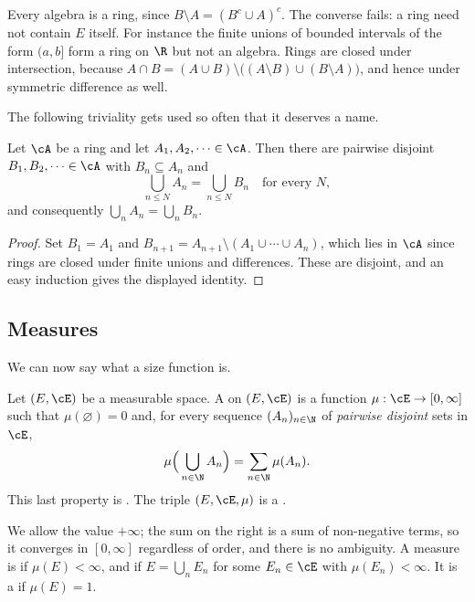 \begin{remark}
	Every algebra is a ring, since $B \setminus A = (B^c \cup A)^c$. The converse fails: a ring need not contain $E$ itself. For instance the finite unions of bounded intervals of the form $(a,b]$ form a ring on $\R$ but not an algebra. Rings are closed under intersection, because $A \cap B = (A \cup B) \setminus \big( (A\setminus B) \cup (B \setminus A)\big)$, and hence under symmetric difference as well.
\end{remark}

The following triviality gets used so often that it deserves a name.

\begin{proposition}[Disjointification]\label{prop:disjointify}
	Let $\cA$ be a ring and let $A_1, A_2, \dots \in \cA$. Then there are pairwise disjoint $B_1, B_2, \dots \in \cA$ with $B_n \subseteq A_n$ and
	$$
	\bigcup_{n \leq N} A_n = \bigcup_{n \leq N} B_n \quad \text{for every } N,
	$$
	and consequently $\bigcup_n A_n = \bigcup_n B_n$.
\end{proposition}
\begin{proof}
	Set $B_1 = A_1$ and $B_{n+1} = A_{n+1} \setminus (A_1 \cup \cdots \cup A_n)$, which lies in $\cA$ since rings are closed under finite unions and differences. These are disjoint, and an easy induction gives the displayed identity.
\end{proof}

\subsection{Measures}

We can now say what a size function is.

\begin{definition}[Measure]
	Let $(E, \cE)$ be a measurable space. A  on $(E, \cE)$ is a function $\mu : \cE \to [0, \infty]$ such that $\mu(\varnothing) = 0$ and, for every sequence $(A_n)_{n\in\N}$ of \emph{pairwise disjoint} sets in $\cE$,
	$$
	\mu\Big( \bigcup_{n \in \N} A_n \Big) = \sum_{n \in \N} \mu(A_n).
	$$
	This last property is . The triple $(E, \cE, \mu)$ is a .
\end{definition}

We allow the value $+\infty$; the sum on the right is a sum of non-negative terms, so it converges in $[0,\infty]$ regardless of order, and there is no ambiguity. A measure is  if $\mu(E) < \infty$, and  if $E = \bigcup_n E_n$ for some $E_n \in \cE$ with $\mu(E_n) < \infty$. It is a  if $\mu(E) = 1$.

